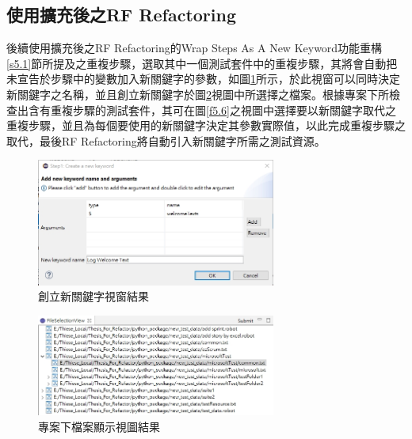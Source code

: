 
\subsection{使用擴充後之RF Refactoring}\label{s5.1.2}
\indent
後續使用擴充後之RF Refactoring的Wrap Steps As A New Keyword功能重構\ref{s5.1}節所提及之重複步驟，選取其中一個測試套件中的重複步驟，其將會自動把未宣告於步驟中的變數加入新關鍵字的參數，如圖\ref{f5.4}所示，於此視窗可以同時決定新關鍵字之名稱，並且創立新關鍵字於圖\ref{f5.5}視圖中所選擇之檔案。根據專案下所檢查出含有重複步驟的測試套件，其可在圖\ref{f5.6}之視圖中選擇要以新關鍵字取代之重複步驟，並且為每個要使用的新關鍵字決定其參數實際值，以此完成重複步驟之取代，最後RF Refactoring將自動引入新關鍵字所需之測試資源。

\begin{figure}[H]
    \centering
    \includegraphics[width=0.7\textwidth]{picture/ch5/Eclipse_create_keyword_in_case1.png}
    \caption{創立新關鍵字視窗結果}
    \label{f5.4}
\end{figure}

\begin{figure}[H]
    \centering
    \includegraphics[width=0.7\textwidth]{picture/ch5/Eclipse_choose_file_to_create_keyword_in_case1.png}
    \caption{專案下檔案顯示視圖結果}
    \label{f5.5}
\end{figure}

